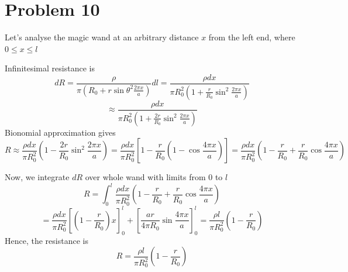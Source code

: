 \documentclass[11pt,a4paper]{scrartcl}
\begin{document}
\section{Problem 10}
\begin{solution}

Let's analyse the magic wand at an arbitrary distance $x$ from the left end, where $0 \leq x \leq l$

Infinitesimal resistance is \[dR = \frac{\rho}{\pi \left(R_0 + r {\sin{\theta}}^2 \frac{2 \pi x}{a} \right)} dl = \frac{\rho dx}{\pi R_{0}^2 \left( 1 + \frac{r}{R_0} \sin^2 \frac{2 \pi x}{a} \right)}\] 
\[\approx \frac{\rho dx}{\pi R_{0}^{2} \left( 1 + \frac{2r}{R_0} \sin^2 \frac{2 \pi x}{a} \right)}\]
Bionomial approximation gives \[R \approx \frac{\rho dx}{\pi R_{0}^{2}} \left( 1 - \frac{2r}{R_0} \sin^2 \frac{2 \pi x}{a} \right) = \frac{\rho dx}{\pi R_{0}^{2}} \left[ 1 - \frac{r}{R_0} \left( 1 - \cos \frac{4\pi x}{a} \right) \right] = \frac{\rho dx}{\pi R_{0}^2} \left( 1 - \frac{r}{R_0} + \frac{r}{R_0} \cos \frac{4 \pi x}{a} \right)\]

Now, we integrate $dR$ over whole wand with limits from $0$ to $l$
\[R = \int_{0}^{l} \frac{\rho dx}{\pi R_{0}^2} \left( 1 - \frac{r}{R_0} + \frac{r}{R_0} \cos \frac{4 \pi x}{a} \right)\]
\[= \frac{\rho dx}{\pi R_{0}^2} \left[ \left( 1 - \frac{r}{R_0} \right) x \right]^{l}_{0} + \left[ \frac{ar}{4 \pi R_0} \sin \frac{4 \pi x}{a} \right]^{l}_{0} = \frac{\rho l}{\pi R_{0}^2} \left( 1 - \frac{r}{R_0} \right)\]
Hence, the resistance is \[\boxed{R = \frac{\rho l}{\pi R_{0}^2} \left( 1 - \frac{r}{R_0} \right)}\]
\end{solution}
\end{document}
